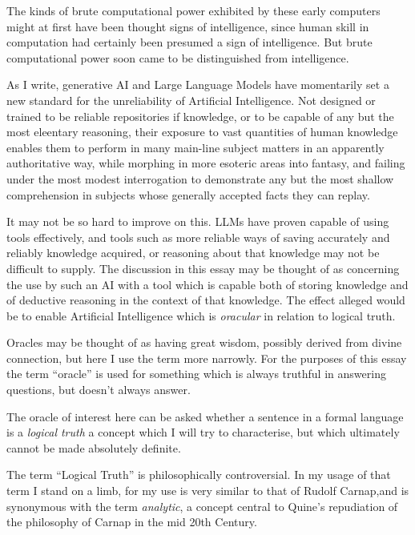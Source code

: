 \documentclass[10pt,titlepage]{book}
\begin{document}
The kinds of brute computational power exhibited by these early computers might at first have been thought signs of intelligence, since human skill in computation had certainly been presumed a sign of intelligence.
But brute computational power soon came to be distinguished from intelligence.

As I write, generative AI and Large Language Models have momentarily set a new standard for the unreliability of Artificial Intelligence.
Not designed or trained to be reliable repositories if knowledge, or to be capable of any but the most eleentary reasoning, their exposure to vast quantities of human knowledge enables them to perform in many main-line subject matters in an apparently authoritative way, while morphing in more esoteric areas into fantasy, and failing under the most modest interrogation to demonstrate any but the most shallow comprehension in subjects whose generally accepted facts they can replay.

It may not be so hard to improve on this.
LLMs have proven capable of using tools effectively, and tools such as more reliable ways of saving accurately and reliably knowledge acquired, or reasoning about that knowledge may not be difficult to supply.
The discussion in this essay may be thought of as concerning the use by such an AI with a tool which is capable both of storing knowledge and of deductive reasoning in the context of that knowledge.
The effect alleged would be to enable Artificial Intelligence which is \emph{oracular} in relation to logical truth.

Oracles may be thought of as having great wisdom, possibly derived from divine connection, but here I use the term more narrowly.
For the purposes of this essay the term ``oracle'' is used for something which is always truthful in answering questions, but doesn't always answer.

The oracle of interest here can be asked whether a sentence in a formal language is a \emph{logical truth} a concept which I will try to characterise, but which ultimately cannot be made absolutely definite.

The term ``Logical Truth'' is philosophically controversial.
In my usage of that term I stand on a limb, for my use is very similar to that of Rudolf Carnap,and is synonymous with the term \emph{analytic}, a concept central to Quine's repudiation of the philosophy of Carnap in the mid 20th Century.
\end{document}
